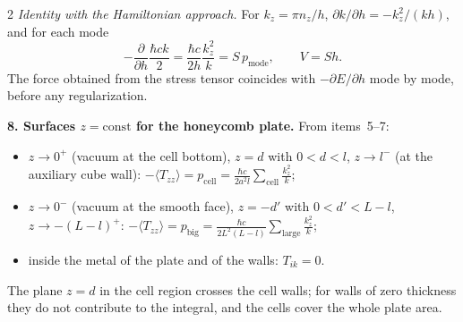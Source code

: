 \documentclass[twoside, 10pt]{article}
\begin{document}
\begin{multicols}{2}
\textit{Identity with the Hamiltonian approach.} For $k_z=\pi n_z/h$,
$\partial k/\partial h=-k_z^2/(kh)$, and for each mode
\[
-\frac{\partial}{\partial h}\frac{\hbar ck}{2}=\frac{\hbar c}{2h}\frac{k_z^2}{k}=S\,p_{\text{mode}},\qquad V=Sh .
\]
The force obtained from the stress tensor coincides with $-\partial E/\partial h$
mode by mode, before any regularization.

\textbf{8. Surfaces $z=\mathrm{const}$ for the honeycomb plate.} From items~5--7:
\begin{itemize}
\item $z\to0^+$ (vacuum at the cell bottom), $z=d$ with $0<d<l$, $z\to l^-$ (at the
auxiliary cube wall): $-\langle T_{zz}\rangle=p_{\text{cell}}=\frac{\hbar c}{2a^2l}\sum_{\text{cell}}\frac{k_z^2}{k}$;
\item $z\to0^-$ (vacuum at the smooth face), $z=-d'$ with $0<d'<L-l$, $z\to-(L-l)^+$:
$-\langle T_{zz}\rangle=p_{\text{big}}=\frac{\hbar c}{2L^2(L-l)}\sum_{\text{large}}\frac{k_z^2}{k}$;
\item inside the metal of the plate and of the walls: $T_{ik}=0$.
\end{itemize}
The plane $z=d$ in the cell region crosses the cell walls; for walls of zero
thickness they do not contribute to the integral, and the cells cover the whole
plate area.


\end{multicols}
\end{document}
